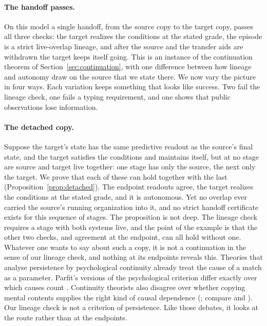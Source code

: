 \paragraph{The handoff passes.}
On this model a single handoff, from the source copy to the target copy, passes
all three checks: the target realizes the conditions at the stated grade, the
episode is a strict live-overlap lineage, and after the source and the
transfer aids are withdrawn the target keeps itself going. This is an instance
of the continuation theorem of Section~\ref{sec:continuation}, with one
difference between how lineage and autonomy draw on the source that we state
there. We now vary the picture in four ways. Each variation keeps something that
looks like success. Two fail the lineage check, one fails a typing
requirement, and one shows that public observations lose information.

\paragraph{The detached copy.}
Suppose the target's state has the same predictive readout as the
source's final state, and the target satisfies the conditions and maintains
itself, but at no stage are source and target live together: one stage has
only the source, the next only the target. We prove that each of these can
hold together with the last (Proposition~\ref{prop:detached}). The endpoint
readouts agree, the target realizes the conditions at the stated grade, and
it is autonomous. Yet no overlap ever carried the source's running
organization into it, and no strict handoff certificate exists for this
sequence of stages. The proposition is not deep. The lineage check requires a
stage with both systems live, and the point of the example is that the other
two checks, and agreement at the endpoint, can all hold without one. Whatever one wants to say about such a copy, it is
not a continuation in the sense of our lineage check, and nothing at its
endpoints reveals this. Theories that analyse persistence by psychological
continuity already treat the cause of a match as a parameter. Parfit's
versions of the psychological criterion differ exactly over which causes count
\citep[\S 78]{Parfit1984}. Continuity theorists also disagree over whether
copying mental contents supplies the right kind of causal dependence
(\citealp[\S 4]{Olson2023SEP}; compare \citealp{ShoemakerSwinburne1984} and
\citealp{Unger1990}). Our lineage check is not a criterion of persistence. Like
those debates, it looks at the route rather than at the endpoints.

